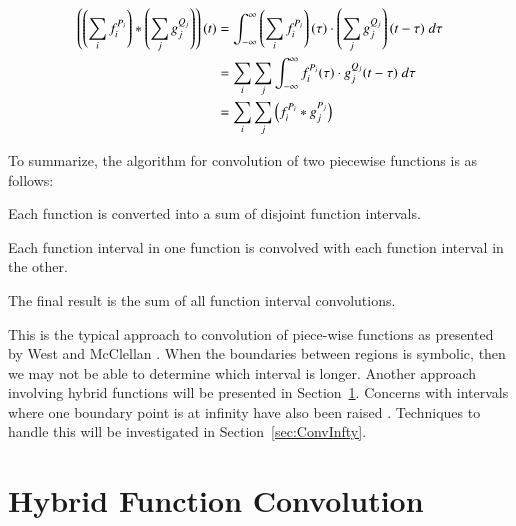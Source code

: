 \begin{align}
	\label{eqn:ConvPiecewise}
	\left(\left(\sum_i f_i^{P_i}\right) * \left(\sum_j g_j^{Q_j}\right)\right) (t)
	&= \int_{-\infty}^\infty \left(\sum_i f_i^{P_i}\right)(\tau)\cdot \left(\sum_j g_j^{Q_j}\right)(t-\tau) \;d\tau
	\notag\\&= \sum_i \sum_j \int_{-\infty}^\infty f_i^{P_i}(\tau) \cdot g_j^{Q_j}(t-\tau) \;d\tau 
	\notag\\&= \sum_i \sum_j \left(f_i^{P_i} * g_j^{P_j}\right)
\end{align}

To summarize, the algorithm for convolution of two piecewise functions is as follows:
\begin{enumerate*}
	\item Each function is converted into a sum of disjoint function intervals.
	\item Each function interval in one function is convolved with each function interval in the other.
	\item The final result is the sum of all function interval convolutions.
\end{enumerate*}


This is the typical approach to convolution of piece-wise functions as presented by West and McClellan  
\cite{west1993symbolic}.
When the boundaries between regions is symbolic, then we may not be able to determine which interval is longer.
Another approach involving hybrid functions will be presented in Section~\ref{sec:HFConvolution}. 
Concerns with intervals where one boundary point is at infinity have also been raised \cite{evans1994algorithms}.
Techniques to handle this will be investigated in Section~\ref{sec:ConvInfty}.








%
%
\section{Hybrid Function Convolution}
\label{sec:HFConvolution}

